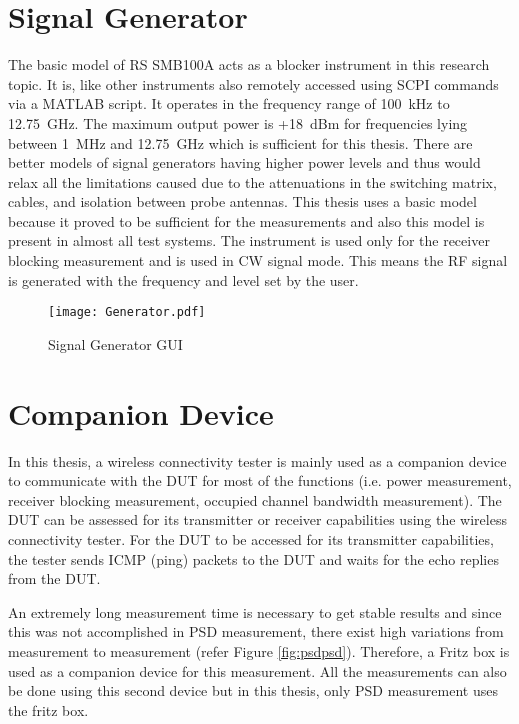 \section{Signal Generator}
The basic model of \acs{RS}\textregistered{} SMB100A acts as a blocker instrument in this research topic. It is, like other instruments also remotely accessed using \acs{SCPI} commands via a MATLAB\textregistered{} script. It operates in the frequency range of 100~kHz to 12.75~GHz. The maximum output power is +18~dBm for frequencies lying between 1~MHz and 12.75~GHz which is sufficient for this thesis. There are better models of signal generators having higher power levels and thus would relax all the limitations caused due to the attenuations in the switching matrix, cables, and isolation between probe antennas. This thesis uses a basic model because it proved to be sufficient for the measurements and also this model is present in almost all test systems. The instrument is used only for the receiver blocking measurement and is used in \acs{CW} signal mode. This means the \acs{RF} signal is generated with the frequency and level set by the user.

\begin{figure}[H]
\centering
\texttt{[image: Generator.pdf]}
\caption{Signal Generator \acs{GUI} \cite{rssmb}}
\label{fig:gen}
\end{figure}

\section{Companion Device}
In this thesis, a wireless connectivity tester is mainly used as a companion device to communicate with the \acs{DUT} for most of the functions (i.e. power measurement, receiver blocking measurement, occupied channel bandwidth measurement). The \acs{DUT} can be assessed for its transmitter or receiver capabilities using the wireless connectivity tester. For the \acs{DUT} to be accessed for its transmitter capabilities, the tester sends \acf{ICMP} (ping) packets to the \acs{DUT} and waits for the echo replies from the \acs{DUT}. 

An extremely long measurement time is necessary to get stable results and since this was not accomplished in \acf{PSD} measurement, there exist high variations from measurement to measurement (refer Figure \ref{fig:psdpsd}). Therefore, a Fritz box is used as a companion device for this measurement. All the measurements can also be done using this second device but in this thesis, only \ac{PSD} measurement uses the fritz box.

